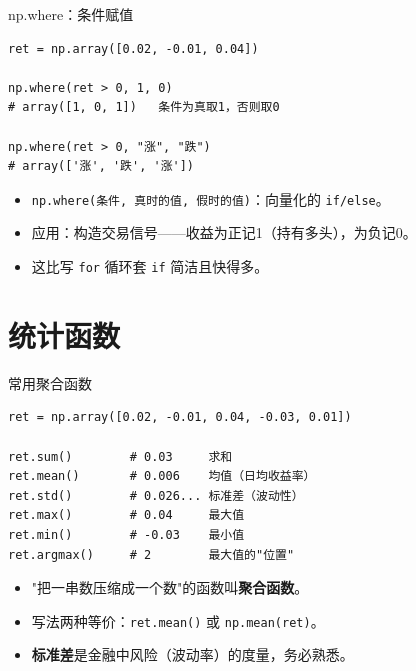 \documentclass[9pt]{ctexbeamer}
\begin{document}
\begin{frame}[fragile]{np.where：条件赋值}
	\begin{lstlisting}
ret = np.array([0.02, -0.01, 0.04])

np.where(ret > 0, 1, 0)
# array([1, 0, 1])   条件为真取1，否则取0

np.where(ret > 0, "涨", "跌")
# array(['涨', '跌', '涨'])
\end{lstlisting}
	\begin{itemize}
		\item \texttt{np.where(条件, 真时的值, 假时的值)}：向量化的 \texttt{if/else}。
		\item 应用：构造交易信号——收益为正记1（持有多头），为负记0。
		\item 这比写 \texttt{for} 循环套 \texttt{if} 简洁且快得多。
	\end{itemize}
\end{frame}


\section{统计函数}

\begin{frame}[fragile]{常用聚合函数}
	\begin{lstlisting}
ret = np.array([0.02, -0.01, 0.04, -0.03, 0.01])

ret.sum()        # 0.03     求和
ret.mean()       # 0.006    均值（日均收益率）
ret.std()        # 0.026... 标准差（波动性）
ret.max()        # 0.04     最大值
ret.min()        # -0.03    最小值
ret.argmax()     # 2        最大值的"位置"
\end{lstlisting}
	\begin{itemize}
		\item "把一串数压缩成一个数"的函数叫\textbf{聚合函数}。
		\item 写法两种等价：\texttt{ret.mean()} 或 \texttt{np.mean(ret)}。
		\item \textbf{标准差}是金融中风险（波动率）的度量，务必熟悉。
	\end{itemize}
\end{frame}
\end{document}
